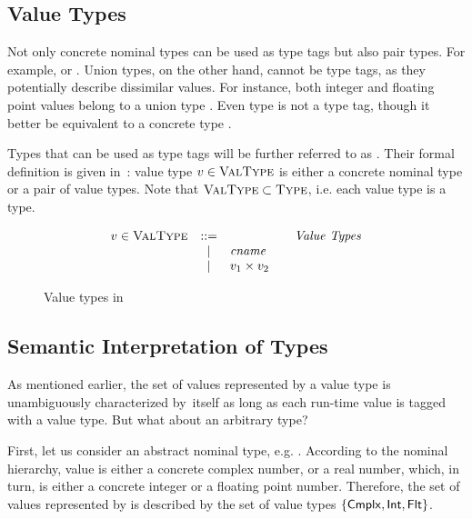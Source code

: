 \subsection{Value Types}

Not only concrete nominal types can be used as type tags
but also pair types. For example, \typair{\tyint}{\tyint}
or \typair{\tystr}{(\typair{\tyint}{\tyint})}.
Union types, on the other hand, cannot be type tags, 
as they potentially describe dissimilar values.
For instance, both integer and floating point values belong
to a union type \tyunion{\tyint}{\tyflt}.
Even type \tyunion{\tyint}{\tyint} is not a type tag, 
though it better be equivalent to a concrete type \tyint.

Types that can be used as type tags will be further referred to
as . 
Their formal definition is given in~:
value type $v \in \textsc{ValType}$ is either a concrete nominal type 
or a pair of value types. 
Note that $\textsc{ValType} \subset \textsc{Type}$, i.e. each value type is a type.

\begin{figure}
	\[
	\begin{array}{rcl@{\qquad}l}
	\vty \in \VType & ::= & & \text{\emph{Value Types}}
	\\ &\Alt& \cname & 
	\\ &\Alt& \typair{\vty_1}{\vty_2} & 
	\end{array}
	\]
	\caption{Value types in \BetaJulia}
	\label{fig:bjsem-value-types}
\end{figure}


\subsection{Semantic Interpretation of Types}

As mentioned earlier, the set of values represented by a value type \vty
is unambiguously characterized by~\vty itself
as long as each run-time value is tagged with a value type.
But what about an arbitrary type?

First, let us consider an abstract nominal type, e.g. \tynum. 
According to the nominal hierarchy, \tynum value 
is either a concrete complex number, or a real number, which, in turn,
is either a concrete integer or a floating point number.
Therefore, the set of values represented by \tynum 
is described by the set of value types $\{\mathsf{Cmplx}, \mathsf{Int}, \mathsf{Flt}\}$.

